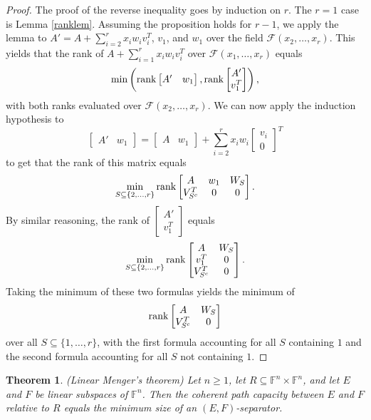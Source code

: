 \documentclass{amsart}
\newtheorem{thm}{Theorem}[section]
\theoremstyle{definition}
\begin{document}
\begin{proof}
The proof of the reverse inequality goes by induction on $r$. The $r = 1$ case is Lemma \ref{ranklem}. Assuming the proposition holds for $r - 1$, we apply the lemma to $A' = A + \sum_{i=2}^r x_iw_iv_i^T$, $v_1$, and $w_1$ over the field $\mathcal{F}(x_2, \ldots, x_r)$. This yields that the rank of $A + \sum_{i=1}^r x_iw_iv_i^T$ over $\mathcal{F}(x_1, \ldots, x_r)$ equals $$\min\left({\rm rank}\left[\begin{matrix}A'& w_1\end{matrix}\right], {\rm rank} \left[\begin{matrix}A'\\ v_1^T\end{matrix}\right]\right),$$ with both ranks evaluated over $\mathcal{F}(x_2, \ldots, x_r)$. We can now apply the induction hypothesis to $$\left[\begin{matrix}A'& w_1\end{matrix}\right] = \left[\begin{matrix}A&w_1\end{matrix}\right] + \sum_{i=2}^r x_iw_i\left[\begin{matrix}v_i\\0\end{matrix}\right]^T$$ to get that the rank of this matrix equals $$\min_{S \subseteq \{2, \ldots, r\}} {\rm rank}\left[\begin{matrix}A&w_1&W_S\\ V_{S^c}^T&0&0\end{matrix}\right].$$ By similar reasoning, the rank of $\left[\begin{matrix}A'\\ v_1^T\end{matrix}\right]$ equals $$\min_{S \subseteq \{2, \ldots, r\}} {\rm rank}\left[\begin{matrix}A&W_S\\v_1^T&0\\V_{S^c}^T&0\end{matrix}\right].$$ Taking the minimum of these two formulas yields the minimum of $${\rm rank} \left[\begin{matrix} A&W_S\\ V_{S^c}^T&0\end{matrix}\right]$$ over all $S \subseteq \{1, \ldots, r\}$, with the first formula accounting for all $S$ containing $1$ and the second formula accounting for all $S$ not containing $1$.
\end{proof}

\begin{thm}\label{qmt} (Linear Menger's theorem)
Let $n \geq 1$, let $R \subseteq \mathbb{F}^n\times \mathbb{F}^n$, and let $E$ and $F$ be linear subspaces of $\mathbb{F}^n$. Then the coherent path capacity between $E$ and $F$ relative to $R$ equals the minimum size of an $(E,F)$-separator.
\end{thm}
\end{document}
